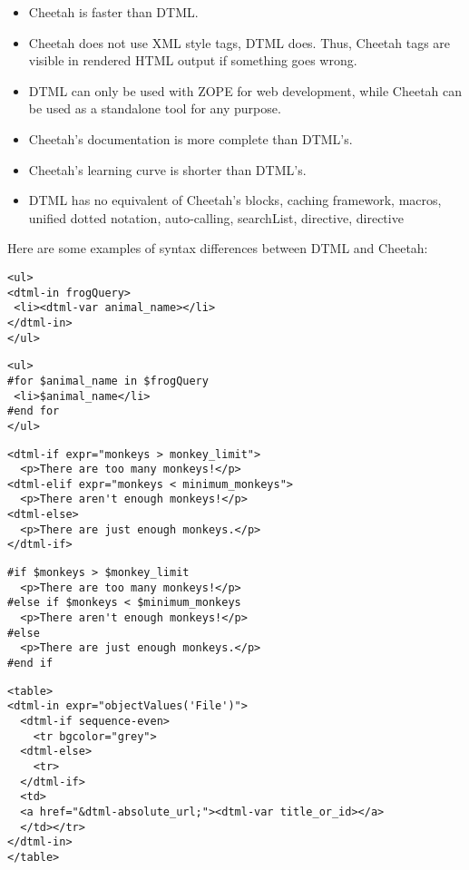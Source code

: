 \begin{itemize}
\item Cheetah is faster than DTML.
\item Cheetah does not use XML style tags, DTML does.  Thus, Cheetah tags are
     visible in rendered HTML output if something goes wrong.
\item DTML can only be used with ZOPE for web development, while Cheetah can be
     used as a standalone tool for any purpose.
\item Cheetah's documentation is more complete than DTML's.
\item Cheetah's learning curve is shorter than DTML's.
\item DTML has no equivalent of Cheetah's blocks, caching framework, macros,
     unified dotted notation, auto-calling, searchList,  directive,
      directive
\end{itemize}

Here are some examples of syntax differences between DTML and Cheetah:
\begin{verbatim}
<ul>
<dtml-in frogQuery>
 <li><dtml-var animal_name></li>
</dtml-in>
</ul>
\end{verbatim}

\begin{verbatim}
<ul>
#for $animal_name in $frogQuery
 <li>$animal_name</li>
#end for
</ul>
\end{verbatim}

\begin{verbatim}
<dtml-if expr="monkeys > monkey_limit">
  <p>There are too many monkeys!</p>
<dtml-elif expr="monkeys < minimum_monkeys">
  <p>There aren't enough monkeys!</p>
<dtml-else>
  <p>There are just enough monkeys.</p>
</dtml-if>
\end{verbatim}

\begin{verbatim}
#if $monkeys > $monkey_limit
  <p>There are too many monkeys!</p>
#else if $monkeys < $minimum_monkeys
  <p>There aren't enough monkeys!</p>
#else
  <p>There are just enough monkeys.</p>
#end if
\end{verbatim}

\begin{verbatim}
<table>
<dtml-in expr="objectValues('File')">
  <dtml-if sequence-even>
    <tr bgcolor="grey">
  <dtml-else>
    <tr>
  </dtml-if>    
  <td>
  <a href="&dtml-absolute_url;"><dtml-var title_or_id></a>
  </td></tr>
</dtml-in>
</table>
\end{verbatim}

